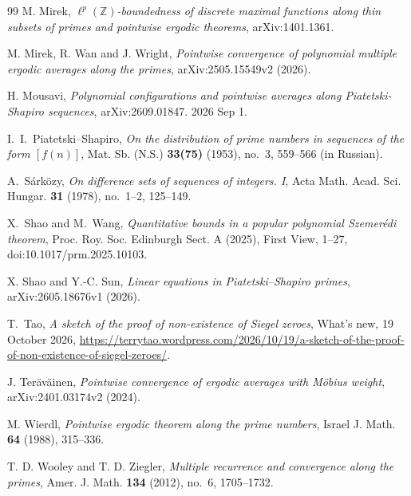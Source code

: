 \documentclass[12pt]{amsart}
\newcommand{\1}{\mathbf 1}
\begin{document}
\begin{thebibliography}{99}
M. Mirek,
\emph{$\ell^p(\mathbb Z)$-boundedness of discrete maximal functions
along thin subsets of primes and pointwise ergodic theorems},
arXiv:1401.1361.

M. Mirek, R. Wan and J. Wright,
\emph{Pointwise convergence of polynomial multiple ergodic averages along
the primes},
arXiv:2505.15549v2 (2026).


 H. Mousavi, \emph{Polynomial configurations and pointwise averages along Piatetski-Shapiro sequences}, arXiv:2609.01847. 2026 Sep 1.

I.~I.~Piatetski--Shapiro,
\emph{On the distribution of prime numbers in sequences of
the form $[f(n)]$},
Mat. Sb. (N.S.) \textbf{33(75)} (1953), no.~3, 559--566
(in Russian).




A.~S\'ark\"ozy,
\emph{On difference sets of sequences of integers. I},
Acta Math. Acad. Sci. Hungar. \textbf{31} (1978),
no.~1--2, 125--149.

X.~Shao and M.~Wang,
\emph{Quantitative bounds in a popular polynomial Szemer\'edi theorem},
Proc. Roy. Soc. Edinburgh Sect. A (2025), First View, 1--27,
doi:10.1017/prm.2025.10103.

X. Shao and Y.-C. Sun,
\emph{Linear equations in Piatetski--Shapiro primes},
arXiv:2605.18676v1 (2026).


T.~Tao,
\emph{A sketch of the proof of non-existence of Siegel zeroes},
What's new, 19 October 2026,
\url{https://terrytao.wordpress.com/2026/10/19/a-sketch-of-the-proof-of-non-existence-of-siegel-zeroes/}.

J. Ter\"av\"ainen,
\emph{Pointwise convergence of ergodic averages with M\"obius weight},
arXiv:2401.03174v2 (2024).

M. Wierdl,
\emph{Pointwise ergodic theorem along the prime numbers},
Israel J. Math. \textbf{64} (1988), 315--336.

T. D. Wooley and T. D. Ziegler,
\emph{Multiple recurrence and convergence along the primes},
Amer. J. Math. \textbf{134} (2012), no.~6, 1705--1732.






\end{thebibliography}
\end{document}
